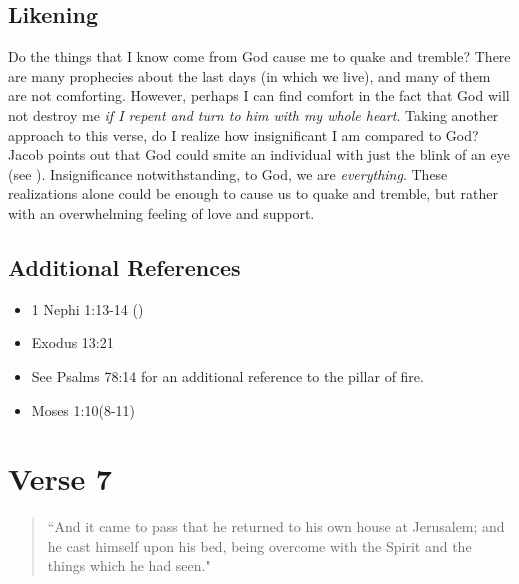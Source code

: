\documentclass[12pt]{report}
\begin{document}
\subsection{Likening\label{1Nephi1:6:likening}}
Do the things that I know come from God cause me to quake and tremble?  There are many prophecies about the last days (in which we live), and many of them are not comforting.  However, perhaps I can find comfort in the fact that God will not destroy me \emph{if I repent and turn to him with my whole heart}.  Taking another approach to this verse, do I realize how insignificant I am compared to God?  Jacob points out that God could smite an individual with just the blink of an eye (see ). Insignificance notwithstanding, to God, we are \emph{everything}.  These realizations alone could be enough to cause us to quake and tremble, but rather with an overwhelming feeling of love and support.

\subsection{Additional References\label{1Nephi1:6:references}}
\begin{itemize}
\item 1 Nephi 1:13-14 ()
\item Exodus 13:21
\item See Psalms 78:14 for an additional reference to the pillar of fire.
\item Moses 1:10(8-11)
\end{itemize}

\section{Verse 7\label{1Nephi1:7}}
\begin{center}
\begin{quote}
``And it came to pass that he returned to his own house at Jerusalem; and he cast himself upon his bed, being overcome with the Spirit and the things which he had seen."
\end{quote}
\end{center}
\end{document}
